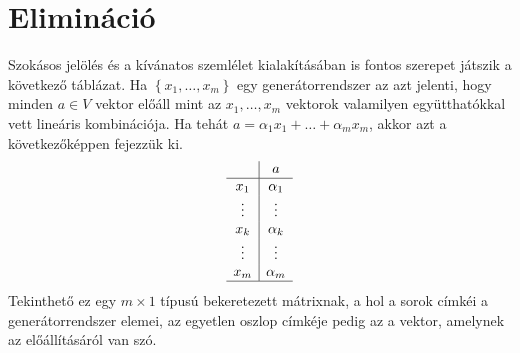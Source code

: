 \documentclass[9pt, a4paper, showtrims]{memoir}
\theoremstyle{plain}
\theoremstyle{remark}
\theoremstyle{definition}
\begin{document}
\section{Elimináció}
Szokásos jelölés és a kívánatos szemlélet kialakításában is fontos szerepet játszik a következő táblázat.
Ha $\left\{ x_1,\ldots,x_m \right\}$ egy generátorrendszer az azt jelenti, hogy minden $a\in V$ vektor
előáll mint az $x_1,\ldots,x_m$ vektorok valamilyen együtthatókkal vett lineáris kombinációja.
Ha tehát $a=\alpha_1x_1+\dots+\alpha_mx_m$, akkor azt a következőképpen fejezzük ki.
\[
	\begin{array}{c|c}
		       & a        \\
		\hline
		x_1    & \alpha_1 \\
		\vdots & \vdots   \\
		x_k    & \alpha_k \\
		\vdots & \vdots   \\
		x_m    & \alpha_m \\
		\hline
	\end{array}
\]
Tekinthető ez egy $m\times 1$ típusú bekeretezett mátrixnak, a hol a sorok címkéi a generátorrendszer elemei,
az egyetlen oszlop címkéje pedig az a vektor, amelynek az előállításáról van szó.
\end{document}
